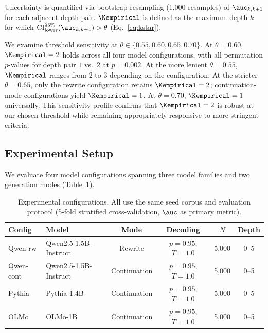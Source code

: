 Uncertainty is quantified via bootstrap resampling (1{,}000 resamples) of $\auc_{k,k+1}$ for each adjacent depth pair.
$\Kempirical$ is defined as the maximum depth $k$ for which $\text{CI}_{\text{lower}}^{95\%}(\auc_{k,k+1}) > \theta$ (Eq.~\ref{eq:kstar}).

We examine threshold sensitivity at $\theta \in \{0.55, 0.60, 0.65, 0.70\}$.
At $\theta = 0.60$, $\Kempirical = 2$ holds across all four model configurations, with all permutation $p$-values for depth pair $1$ vs.\ $2$ at $p = 0.002$.
At the more lenient $\theta = 0.55$, $\Kempirical$ ranges from 2 to 3 depending on the configuration.
At the stricter $\theta = 0.65$, only the rewrite configuration retains $\Kempirical = 2$; continuation-mode configurations yield $\Kempirical = 1$.
At $\theta = 0.70$, $\Kempirical = 1$ universally.
This sensitivity profile confirms that $\Kempirical = 2$ is robust at our chosen threshold while remaining appropriately responsive to more stringent criteria.

\subsection{Experimental Setup}
\label{sec:experimental_setup}

We evaluate four model configurations spanning three model families and two generation modes (Table~\ref{tab:setup}).

\begin{table}[t]
\centering
\small
\caption{Experimental configurations. All use the same seed corpus and evaluation protocol (5-fold stratified cross-validation, $\auc$ as primary metric).}
\label{tab:setup}
\begin{tabular}{llcccc}
\toprule
\textbf{Config} & \textbf{Model} & \textbf{Mode} & \textbf{Decoding} & $N$ & \textbf{Depth} \\
\midrule
Qwen-rw   & Qwen2.5-1.5B-Instruct & Rewrite      & $p{=}0.95$, $T{=}1.0$ & 5{,}000 & 0--5 \\
Qwen-cont & Qwen2.5-1.5B-Instruct & Continuation & $p{=}0.95$, $T{=}1.0$ & 5{,}000 & 0--5 \\
Pythia    & Pythia-1.4B            & Continuation & $p{=}0.95$, $T{=}1.0$ & 5{,}000 & 0--5 \\
OLMo      & OLMo-1B               & Continuation & $p{=}0.95$, $T{=}1.0$ & 5{,}000 & 0--5 \\
\bottomrule
\end{tabular}
\end{table}

